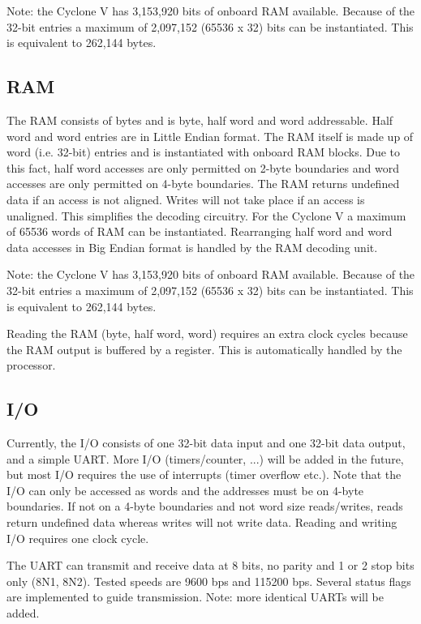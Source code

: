 \documentclass[12pt]{article}
\begin{document}
Note: the Cyclone V has 3,153,920 bits of onboard RAM available. Because of the 32-bit entries a maximum of 2,097,152 (65536 x 32) bits can be instantiated. This is equivalent to 262,144 bytes.

\subsection{RAM}
\label{sec:ram}
The RAM consists of bytes and is byte, half word and word addressable. Half word and word entries are in Little Endian format. The RAM itself is made up of word (i.e. 32-bit) entries and is instantiated with onboard RAM blocks. Due to this fact, half word accesses are only permitted on 2-byte boundaries and word accesses are only permitted on 4-byte boundaries. The RAM returns undefined data if an access is not aligned. Writes will not take place if an access is unaligned. This simplifies the decoding circuitry. For the Cyclone V a maximum of 65536 words of RAM can be instantiated. Rearranging half word and word data accesses in Big Endian format is handled by the RAM decoding unit.

Note: the Cyclone V has 3,153,920 bits of onboard RAM available. Because of the 32-bit entries a maximum of 2,097,152 (65536 x 32) bits can be instantiated. This is equivalent to 262,144 bytes.

Reading the RAM (byte, half word, word) requires an extra clock cycles because the RAM output is buffered by a register. This is automatically handled by the processor.

\subsection{I/O}
\label{sec/io}
Currently, the I/O consists of one 32-bit data input and one 32-bit data output, and a simple UART. More I/O (timers/counter, ...) will be added in the future, but most I/O requires the use of interrupts (timer overflow etc.). Note that the I/O can only be accessed as words and the addresses must be on 4-byte boundaries. If not on a 4-byte boundaries and not word size reads/writes, reads return undefined data whereas writes will not write data. Reading and writing I/O requires one clock cycle.

The UART can transmit and receive data at 8 bits, no parity and 1 or 2 stop bits only (8N1, 8N2). Tested speeds are 9600 bps and 115200 bps. Several status flags are implemented to guide transmission. Note: more identical UARTs will be added.
\end{document}
